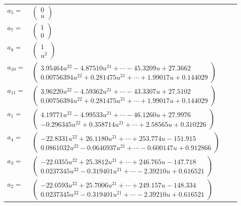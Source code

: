 \documentclass[1p]{elsarticle_modified}
\theoremstyle{definition}
\begin{document}
\begin{tabular}{m{7pt} m{180pt} m{7pt} m{180pt} }
\flushright $a_{5}=$&$\begin{pmatrix}0\\u\end{pmatrix}$ \\
\flushright $a_{7}=$&$\begin{pmatrix}1\\0\end{pmatrix}$ \\
\flushright $a_{8}=$&$\begin{pmatrix}1\\u^2\end{pmatrix}$ \\
\flushright $a_{10}=$&$\begin{pmatrix}3.95464 u^{22}-4.87510 u^{21}+\cdots-45.3209 u+27.3662\\0.00756394 u^{22}+0.281475 u^{21}+\cdots+1.99017 u+0.144029\end{pmatrix}$ \\
\flushright $a_{11}=$&$\begin{pmatrix}3.96220 u^{22}-4.59362 u^{21}+\cdots-43.3307 u+27.5102\\0.00756394 u^{22}+0.281475 u^{21}+\cdots+1.99017 u+0.144029\end{pmatrix}$ \\
\flushright $a_{1}=$&$\begin{pmatrix}4.19771 u^{22}-4.99533 u^{21}+\cdots-46.1260 u+27.9976\\-0.296345 u^{22}+0.358714 u^{21}+\cdots+2.58565 u+0.310226\end{pmatrix}$ \\
\flushright $a_{4}=$&$\begin{pmatrix}-22.8331 u^{22}+26.1180 u^{21}+\cdots+253.774 u-151.915\\0.0861032 u^{22}-0.0646937 u^{21}+\cdots-0.600147 u+0.912866\end{pmatrix}$ \\
\flushright $a_{3}=$&$\begin{pmatrix}-22.0355 u^{22}+25.3812 u^{21}+\cdots+246.765 u-147.718\\0.0237345 u^{22}-0.319401 u^{21}+\cdots-2.39210 u+0.616521\end{pmatrix}$ \\
\flushright $a_{2}=$&$\begin{pmatrix}-22.0593 u^{22}+25.7006 u^{21}+\cdots+249.157 u-148.334\\0.0237345 u^{22}-0.319401 u^{21}+\cdots-2.39210 u+0.616521\end{pmatrix}$ \\

\end{tabular}
\end{document}
